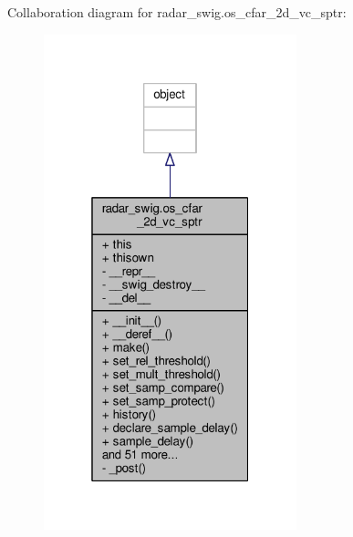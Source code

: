Collaboration diagram for radar\+\_\+swig.\+os\+\_\+cfar\+\_\+2d\+\_\+vc\+\_\+sptr\+:
\nopagebreak
\begin{figure}[H]
\begin{center}
\leavevmode
\includegraphics[width=208pt]{de/d57/classradar__swig_1_1os__cfar__2d__vc__sptr__coll__graph}
\end{center}
\end{figure}
